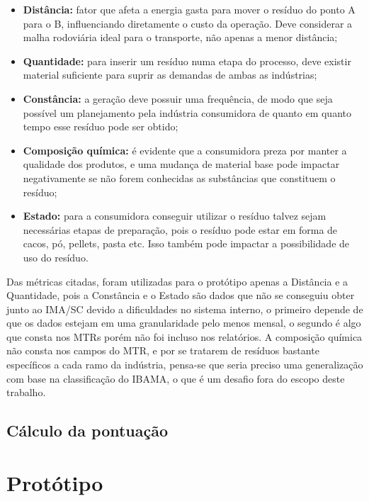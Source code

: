 \begin{itemize} 
	\item \textbf{Distância:} fator que afeta a energia gasta para mover o resíduo do ponto A para o B, influenciando diretamente o custo da operação. Deve considerar a malha rodoviária ideal para o transporte, não apenas a menor distância;
	\item \textbf{Quantidade:} para inserir um resíduo numa etapa do processo, deve existir material suficiente para suprir as demandas de ambas as indústrias;
	\item \textbf{Constância:} a geração deve possuir uma frequência, de modo que seja possível um planejamento pela indústria consumidora de quanto em quanto tempo esse resíduo pode ser obtido;
  \item \textbf{Composição química:} é evidente que a consumidora preza por manter a qualidade dos produtos, e uma mudança de material base pode impactar negativamente se não forem conhecidas as substâncias que constituem o resíduo;
  \item \textbf{Estado:} para a consumidora conseguir utilizar o resíduo talvez sejam necessárias etapas de preparação, pois o resíduo pode estar em forma de cacos, pó, pellets, pasta etc. Isso também pode impactar a possibilidade de uso do resíduo.
\end{itemize}

Das métricas citadas, foram utilizadas para o protótipo apenas a Distância e a Quantidade, pois a Constância e o Estado são dados que não se conseguiu obter junto ao \gls{IMA/SC} devido a dificuldades no sistema interno, o primeiro depende de que os dados estejam em uma granularidade pelo menos mensal, o segundo é algo que consta nos \gls{MTR}s porém não foi incluso nos relatórios. A composição química não consta nos campos do \gls{MTR}, e por se tratarem de resíduos bastante específicos a cada ramo da indústria, pensa-se que seria preciso uma generalização com base na classificação do \gls{IBAMA}, o que é um desafio fora do escopo deste trabalho. 

\subsection{Cálculo da pontuação}

\section{Protótipo}

